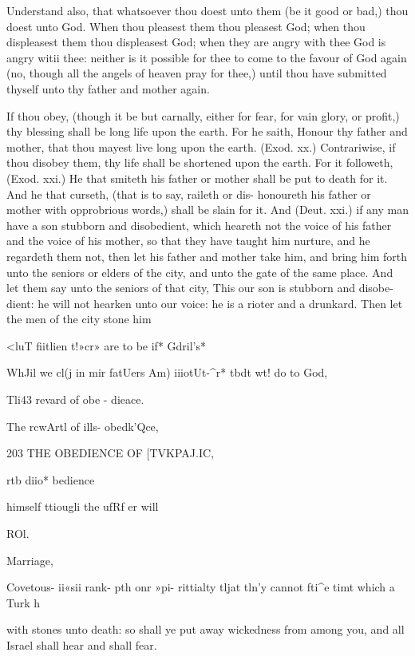 \documentclass{custom}
\begin{document}
Understand also, that whatsoever thou doest unto them 
(be it good or bad,) thou doest unto God. When thou 
pleasest them thou pleasest God; when thou displeasest 
them thou displeasest God; when they are angry with 
thee God is angry witii thee: neither is it possible for 
thee to come to the favour of God again (no, though 
all the angels of heaven pray for thee,) until thou have 
submitted thyself unto thy father and mother again. 

If thou obey, (though it be but carnally, either for fear,
for vain glory, or profit,) thy blessing shall be long life 
upon the earth. For he saith, Honour thy father and 
mother, that thou mayest live long upon the earth. (Exod. 
xx.) Contrariwise, if thou disobey them, thy life shall 
be shortened upon the earth. For it followeth, (Exod. xxi.) 
He that smiteth his father or mother shall be put to death 
for it. And he that curseth, (that is to say, raileth or dis- 
honoureth his father or mother with opprobrious words,) 
shall be slain for it. And (Deut. xxi.) if any man have 
a son stubborn and disobedient, which heareth not the 
voice of his father and the voice of his mother, so that 
they have taught him nurture, and he regardeth them not, 
then let his father and mother take him, and bring him 
forth unto the seniors or elders of the city, and unto the 
gate of the same place. And let them say unto the 
seniors of that city, This our son is stubborn and disobe- 
dient: he will not hearken unto our voice: he is a rioter 
and a drunkard. Then let the men of the city stone him 

<luT fiitlien 
t!»cr» are to 
be if* Gdril's* 

WhJil we 
cl(j in mir 
fatUers Am) 
iiiotUt-^r* 
tbdt wt! do 
to God, 

Tli43 revard 
of obe - 
dieace. 

The rcwArtl 
of ills- 
obedk'Qce, 


203
THE OBEDIENCE OF 
[TVKPAJ.IC, 

rtb diio* 
bedience 

himself 
ttiougli the 
ufRf er will 

ROl. 

Marriage, 

Covetous- 
ii«sii rank- 
pth onr »pi- 
rittialty 
tljat tln'y 
cannot fti^e 
timt which 
a Turk h 

with stones unto death: so shall ye put away wickedness
from among you, and all Israel shall hear and shall fear. 
\end{document}
